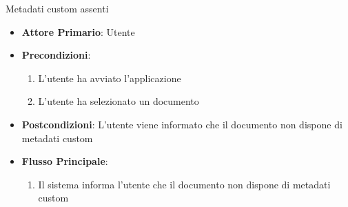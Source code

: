  {Metadati custom assenti}
\begin{itemize}
    \item \textbf{Attore Primario}: Utente
    \item \textbf{Precondizioni}:
    \begin{enumerate}
        \item L'utente ha avviato l'applicazione
        \item L'utente ha selezionato un documento
    \end{enumerate}
    \item \textbf{Postcondizioni}: L'utente viene informato che il documento non dispone di metadati custom
    \item \textbf{Flusso Principale}: 
    \begin{enumerate}
        \item Il sistema informa l'utente che il documento non dispone di metadati custom
    \end{enumerate}
\end{itemize}
